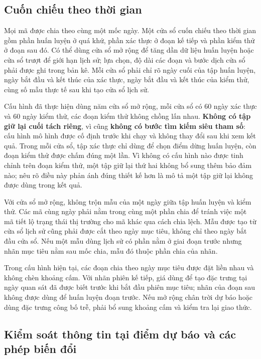 \subsection{Cuốn chiếu theo thời gian}

Mọi mã được chia theo cùng một mốc ngày. Một cửa sổ cuốn chiếu theo thời gian gồm phần
huấn luyện ở quá khứ, phần xác thực ở đoạn kế tiếp và phần kiểm thử ở đoạn sau đó. Có
thể dùng cửa sổ mở rộng để tăng dần dữ liệu huấn luyện hoặc cửa sổ trượt để giới hạn
lịch sử; lựa chọn, độ dài các đoạn và bước dịch cửa sổ phải được ghi trong bản kê.
Mỗi cửa sổ phải chỉ rõ ngày cuối của tập huấn luyện, ngày bắt đầu và kết thúc của
xác thực, ngày bắt đầu và kết thúc của kiểm thử, cùng số mẫu thực tế sau khi tạo cửa
sổ lịch sử.

Cấu hình đã thực hiện dùng năm cửa sổ mở rộng, mỗi cửa sổ có 60 ngày xác thực và 60
ngày kiểm thử, các đoạn kiểm thử không chồng lấn nhau. \textbf{Không có tập giữ lại
cuối tách riêng}, vì cũng \textbf{không có bước tìm kiếm siêu tham số}: cấu hình mô
hình được cố định trước khi chạy và không thay đổi sau khi xem kết quả. Trong mỗi cửa
sổ, tập xác thực chỉ dùng để chọn điểm dừng huấn luyện, còn đoạn kiểm thử được chấm
đúng một lần. Vì không có cấu hình nào được tinh chỉnh trên đoạn kiểm thử, một tập
giữ lại thứ hai không bổ sung thêm bảo đảm nào; nêu rõ điều này phản ánh đúng thiết
kế hơn là mô tả một tập giữ lại không được dùng trong kết quả.

Với cửa sổ mở rộng, không trộn mẫu của một ngày giữa tập huấn luyện và kiểm thử. Các
mã cùng ngày phải nằm trong cùng một phần chia để tránh việc một mã tiết lộ trạng
thái thị trường cho mã khác qua cách chia lệch. Mẫu được tạo từ cửa sổ lịch sử cũng
phải được cắt theo ngày mục tiêu, không chỉ theo ngày bắt đầu cửa sổ. Nếu một mẫu
dùng lịch sử có phần nằm ở giai đoạn trước nhưng nhãn mục tiêu nằm sau mốc chia, mẫu
đó thuộc phần chia của nhãn.

Trong cấu hình hiện tại, các đoạn chia theo ngày mục tiêu được đặt liền nhau và không
chèn khoảng cấm. Với nhãn phiên kế tiếp, giá dùng để tạo đặc trưng tại ngày quan sát
đã được biết trước khi bắt đầu phiên mục tiêu; nhãn của đoạn sau không được dùng để
huấn luyện đoạn trước. Nếu mở rộng chân trời dự báo hoặc dùng đặc trưng công bố trễ,
phải bổ sung khoảng cấm và kiểm tra lại giao thức.

\subsection{Kiểm soát thông tin tại điểm dự báo và các phép biến đổi}


